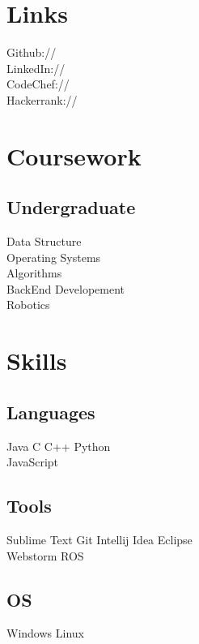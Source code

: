 \documentclass[]{resume}
\begin{document}
\begin{minipage}[t]{0.33\textwidth}
\section{Links} 
Github:// \href{https://github.com/Abheet099}{} \\
LinkedIn://  \href{https://www.linkedin.com/in/abheet-verma-44854910a/}{} \\
CodeChef://  \href{https://codechef.com/users/coder099}{} \\
Hackerrank://  \href{https://www.hackerrank.com/abheetverma099}{}
\sectionsep


\section{Coursework}

\subsection{Undergraduate}
Data Structure\\
Operating Systems \\
Algorithms \\
BackEnd Developement \\
Robotics \\
\sectionsep


\section{Skills}
\subsection{Languages}
Java \textbullet{}   C \textbullet{} C++ \textbullet{} Python \\
JavaScript
\subsection{Tools}
Sublime Text \textbullet{} Git \textbullet{} Intellij Idea \textbullet{} Eclipse  \\
Webstorm \textbullet{} ROS
\subsection{OS}
Windows \textbullet{} Linux

\end{minipage}
\end{document}
